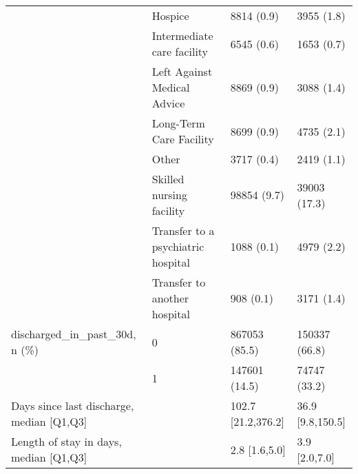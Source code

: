 \begin{tabular}{llll}
                                       & Hospice &                     8814 (0.9) &        3955 (1.8) \\
                                       & Intermediate care facility &                     6545 (0.6) &        1653 (0.7) \\
                                       & Left Against Medical Advice &                     8869 (0.9) &        3088 (1.4) \\
                                       & Long-Term Care Facility &                     8699 (0.9) &        4735 (2.1) \\
                                       & Other &                     3717 (0.4) &        2419 (1.1) \\
                                       & Skilled nursing facility &                    98854 (9.7) &      39003 (17.3) \\
                                       & Transfer to a psychiatric hospital &                     1088 (0.1) &        4979 (2.2) \\
                                       & Transfer to another hospital &                      908 (0.1) &        3171 (1.4) \\
discharged\_in\_past\_30d, n (\%) & 0 &                  867053 (85.5) &     150337 (66.8) \\
                                       & 1 &                  147601 (14.5) &      74747 (33.2) \\
Days since last discharge, median [Q1,Q3] &   &             102.7 [21.2,376.2] &  36.9 [9.8,150.5] \\
Length of stay in days, median [Q1,Q3] &   &                  2.8 [1.6,5.0] &     3.9 [2.0,7.0] \\
\bottomrule
\end{tabular}
